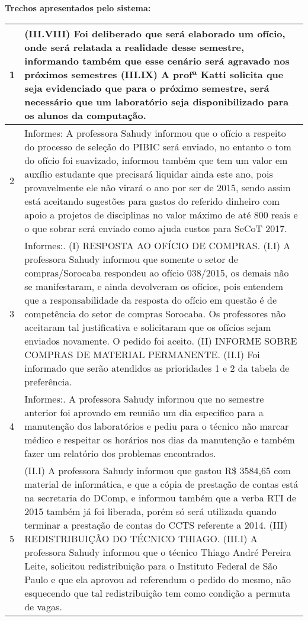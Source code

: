 \noindent
\textbf{Trechos apresentados pelo sistema:}
\begin{longtable}{|p{0.2cm}|p{17cm}|}
\hline 
1 & 
(III.VIII) Foi deliberado que será elaborado um ofício, onde será relatada a realidade desse semestre, informando também que esse cenário será agravado nos próximos semestres (III.IX) A profª Katti solicita que seja evidenciado que para o próximo semestre, será necessário que um laboratório seja disponibilizado para os alunos da computação. \\ \hline 
2 &
Informes: A professora Sahudy informou que o ofício a respeito do processo de seleção do PIBIC será enviado, no entanto o tom do ofício foi suavizado, informou também que tem um valor em auxílio estudante que precisará liquidar ainda este ano, pois provavelmente ele não virará o ano por ser de 2015, sendo assim está aceitando sugestões para gastos do referido dinheiro com apoio a projetos de disciplinas no valor máximo de até 800 reais e o que sobrar será enviado como ajuda custos para SeCoT 2017.
 \\ \hline 
3 &
Informes:. (I) RESPOSTA AO OFÍCIO DE COMPRAS. (I.I) A professora Sahudy informou que somente o setor de compras/Sorocaba respondeu ao ofício 038/2015, os demais não se manifestaram, e ainda devolveram os ofícios, pois entendem que a responsabilidade da resposta do ofício em questão é de competência do setor de compras Sorocaba. Os professores não aceitaram tal justificativa e solicitaram que os ofícios sejam enviados novamente. O pedido foi aceito. (II) INFORME SOBRE COMPRAS DE MATERIAL PERMANENTE. (II.I) Foi informado que serão atendidos as prioridades 1 e 2 da tabela de preferência.
 \\ \hline 
4 &
Informes:. A professora Sahudy informou que no semestre anterior foi aprovado em reunião um dia específico para a manutenção dos laboratórios e pediu para o técnico não marcar médico e respeitar os horários nos dias da manutenção e também fazer um relatório dos problemas encontrados.
 \\ \hline 
5 &
(II.I) A professora Sahudy informou que gastou R\$ 3584,65 com material de informática, e que a cópia de prestação de contas está na secretaria do DComp, e informou também que a verba RTI de 2015 também já foi liberada, porém só será utilizada quando terminar a prestação de contas do CCTS referente a 2014. (III) REDISTRIBUIÇÃO DO TÉCNICO THIAGO. (III.I) A professora Sahudy informou que o técnico Thiago André Pereira Leite, solicitou redistribuição para o Instituto Federal de São Paulo e que ela aprovou ad referendum o pedido do mesmo, não esquecendo que tal redistribuição tem como condição a permuta de vagas.

\end{longtable}
